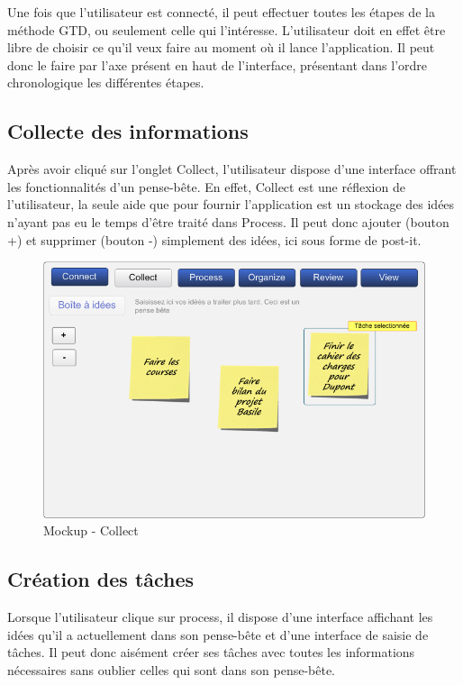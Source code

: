 Une fois que l'utilisateur est connecté, il peut effectuer toutes les étapes 
de la méthode GTD, ou seulement celle qui l'intéresse. L'utilisateur doit
en effet être libre de choisir ce qu'il veux faire au moment où il lance
l'application. Il peut donc le faire par l'axe présent en haut de
l'interface, présentant dans l'ordre chronologique les différentes étapes.

\subsection{Collecte des informations}
Après avoir cliqué sur l'onglet Collect, l'utilisateur dispose d'une interface offrant
les fonctionnalités d'un pense-bête. En effet, Collect est une réflexion de
l'utilisateur, la seule aide que pour fournir l'application est un stockage des
idées n'ayant pas eu le temps d'être traité dans Process. Il peut donc ajouter (bouton +) et supprimer (bouton -) simplement des idées, ici sous forme de post-it.


\begin{figure}[H]
  \begin{center}
  \includegraphics[scale=0.5]{diagrams/collect.png}
  \caption{Mockup - Collect}
  \end{center}
\end{figure}

\subsection{Création des tâches}
Lorsque l'utilisateur clique sur process, il dispose d'une interface affichant
les idées qu'il a actuellement dans son pense-bête et d'une interface de saisie
de tâches. Il peut donc aisément créer ses tâches avec toutes les informations
nécessaires sans oublier celles qui sont dans son pense-bête.


